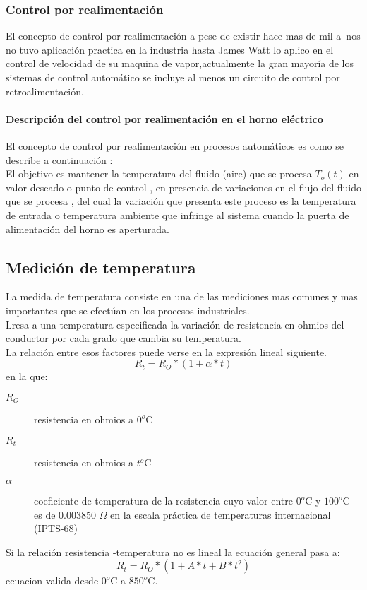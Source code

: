 \documentclass[Spanish,12pt,doublespace,german,letterpaper,dvipdfm]{article}
\begin{document}
\subsubsection{Control por realimentaci\'on} El concepto de control
por realimentación a pese de existir hace mas de mil a~nos no tuvo
aplicaci\'on practica en la industria hasta James Watt lo aplico
en el control de velocidad de su maquina de vapor,actualmente la
gran mayoría de los sistemas de control automático se incluye al
menos un circuito de control por retroalimentación.

\paragraph{Descripción del control por realimentaci\'on en el horno
eléctrico} El concepto de  control por realimentación en procesos
automáticos es como se describe a continuaci\'on :\\
El objetivo es mantener la temperatura del fluido (aire) que se
procesa $T_o(t)$ en valor  deseado o punto de control , en
presencia de variaciones en el flujo del fluido que se procesa ,
del cual la variación que presenta este proceso es la temperatura
de entrada o temperatura ambiente que infringe al sistema cuando
la puerta de alimentación del horno es aperturada.\\


\subsection{Medici\'on de temperatura}
La medida de temperatura consiste en una de las mediciones mas
comunes y mas importantes que se efectúan en los procesos
industriales.\\
Lresa a
una temperatura especificada la variación de resistencia en
ohmios del conductor por cada grado que cambia su temperatura.\\
La relación entre esos factores puede verse en la expresión lineal
siguiente.
\begin{equation*}
  R_t=R_O*(1+\alpha*t)
\end{equation*}
en la que:
\begin{description}
  \item[$R_O$] resistencia en ohmios a $0^{o}$C
  \item[$R_t$] resistencia en ohmios a $t^{o}$C
  \item[$\alpha$] coeficiente de temperatura de la resistencia
  cuyo valor entre $0^{o}$C y $100^{o}$C es de 0.003850 $\Omega$
  en la escala pr\'actica de temperaturas internacional (IPTS-68)
\end{description}
Si la relación resistencia -temperatura no es lineal la ecuación
general pasa a:
\begin{equation*}
  R_t=R_O*(1+A*t+B*t^{2})
\end{equation*}
ecuacion valida desde $0^{o}$C a $850^{o}$C.\\
\end{document}
